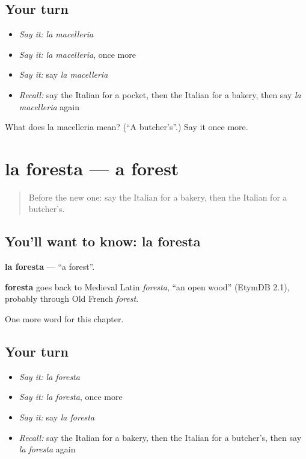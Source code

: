 \subsection*{Your turn}
\begin{itemize}
\raggedright
  \item \emph{Say it:} \emph{la macelleria}
  \item \emph{Say it:} \emph{la macelleria}, once more
  \item \emph{Say it:} say \emph{la macelleria}
  \item \emph{Recall:} say the Italian for a pocket, then the Italian for a bakery, then say \emph{la macelleria} again
\end{itemize}

\begin{tcolorbox}[breakable,colback=teal!4,colframe=teal!35!black,title={Before you move on}]
What does la macelleria mean? (\textquotedblleft{}A butcher's\textquotedblright{}.) Say it once more.
\end{tcolorbox}
\section[la foresta]{la foresta — a forest}

\label{lesson:IT-C221-foresta}



\begin{quote}
Before the new one: say the Italian for a bakery, then the Italian for a butcher's.
\end{quote}

\subsection*{You'll want to know: la foresta}
\textbf{la foresta} — \textquotedblleft{}a forest\textquotedblright{}.

\begin{cousinweb}
\textbf{foresta} goes back to Medieval Latin \emph{foresta}, \textquotedblleft{}an open wood\textquotedblright{} (EtymDB 2.1), probably through Old French \emph{forest}.
\end{cousinweb}

\begin{grammarlens}[title={What you've built}]
One more word for this chapter.
\end{grammarlens}

\subsection*{Your turn}
\begin{itemize}
\raggedright
  \item \emph{Say it:} \emph{la foresta}
  \item \emph{Say it:} \emph{la foresta}, once more
  \item \emph{Say it:} say \emph{la foresta}
  \item \emph{Recall:} say the Italian for a bakery, then the Italian for a butcher's, then say \emph{la foresta} again
\end{itemize}

